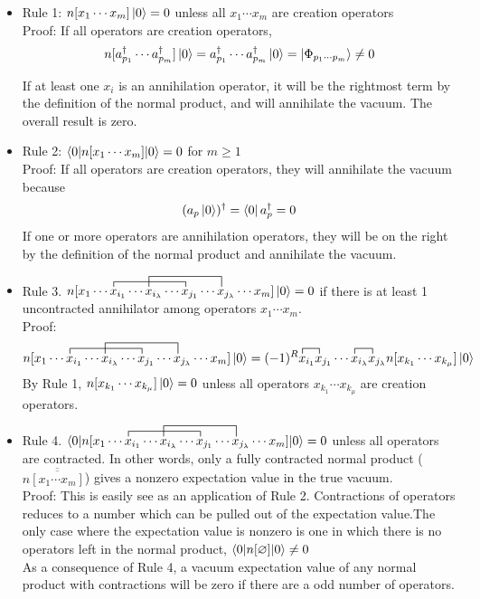 \documentclass{article}
\newcommand{\ol}{\overline}
\newcommand{\dg}{\ensuremath{^\dagger} }
\newcommand{\cd}{\ensuremath{\cdots} }
\begin{document}
\begin{itemize}
\item Rule 1: $n[x_1 \cd x_m]\ket{0} = 0$ unless all $x_1 \cd x_m$ are creation operators \\

Proof: If all operators are creation operators, 
\[n[a_{p_1}\dg \cd a_{p_m}\dg]\ket{0} = a_{p_1}\dg \cd a_{p_m}\dg\ket{0} = \ket{\Phi_{p_1 \cd p_m}} \neq 0\]

If at least one $x_i$ is an annihilation operator, it will be the rightmost term by the definition of the normal product, and will annihilate the vacuum.
The overall result is zero.  
\item Rule 2: $\braket{0 | n[x_1 \cd x_m] | 0} = 0$ for  $m \geq 1$ \\

Proof: If all operators are creation operators, they will annihilate the vacuum because 
\[(a_p\ket{0})\dg = \bra{0}a_p\dg = 0\]
If one or more operators are annihilation operators, they will be on the right by the definition of the normal product and annihilate the vacuum. 
\item Rule 3. $\contraction{n[x_1 \cd }{x}{{}_{i_1} \cd x_{i_\lambda} \cd }{x}
\contraction[2ex]{n[x_1 \cd x_{i_1} \cd}{ x}{{}_{i_\lambda} \cd x_{j_1} \cd }{x} 
n[x_1 \cd x_{i_1} \cd x_{i_\lambda} \cd x_{j_1} \cd x_{j_\lambda} \cd x_m] \ket{0} = 0$ if there is at least 1 uncontracted annihilator among operators $x_1 \cd x_m$.  \\

Proof:
\[ 
\contraction{n[x_1 \cd }{x}{{}_{i_1} \cd x_{i_\lambda} \cd }{x}
\contraction[2ex]{n[x_1 \cd x_{i_1} \cd}{ x}{{}_{i_\lambda} \cd x_{j_1} \cd }{x} 
n[x_1 \cd x_{i_1} \cd x_{i_\lambda} \cd x_{j_1} \cd x_{j_\lambda} \cd x_m] \ket{0}
= 
\contraction{(-1)^R}{x}{{}_{i_1} }{x}
\contraction{(-1)^R x_{i_1}x_{j_1} \cd}{x}{{}_{i_\lambda} }{x}
(-1)^R x_{i_1}x_{j_1} \cd x_{i_\lambda} x_{j_\lambda} n[x_{k_1} \cd x_{k_\mu}] \ket{0}
\] 
By Rule 1, $n[x_{k_1} \cd x_{k_\mu}] \ket{0} = 0$ unless all operators $x_{k_1} \cd x_{k_\mu}$ are creation operators. 
\item Rule 4. $\braket{0| \contraction{n[x_1 \cd }{x}{{}_{i_1} \cd x_{i_\lambda} \cd }{x}
\contraction[2ex]{n[x_1 \cd x_{i_1} \cd}{ x}{{}_{i_\lambda} \cd x_{j_1} \cd }{x} 
n[x_1 \cd x_{i_1} \cd x_{i_\lambda} \cd x_{j_1} \cd x_{j_\lambda} \cd x_m] |0} = 0$ unless all operators are contracted. 
In other words, only a fully contracted normal product ($n\ol{\ol{[x_1 \cd x_m] }}$) gives a nonzero expectation value in the true vacuum. \\

Proof: This is easily see as an application of Rule 2. Contractions of operators reduces to a number which can be pulled out of the expectation value.The only case where the expectation value is nonzero is one in which there is no operators left in the normal product, $\braket{0 | n[\varnothing] | 0} \neq 0$ \\

As a consequence of Rule 4, a vacuum expectation value of any normal product with contractions will be zero if there are a odd number of operators. 
\end{itemize}
\end{document}
